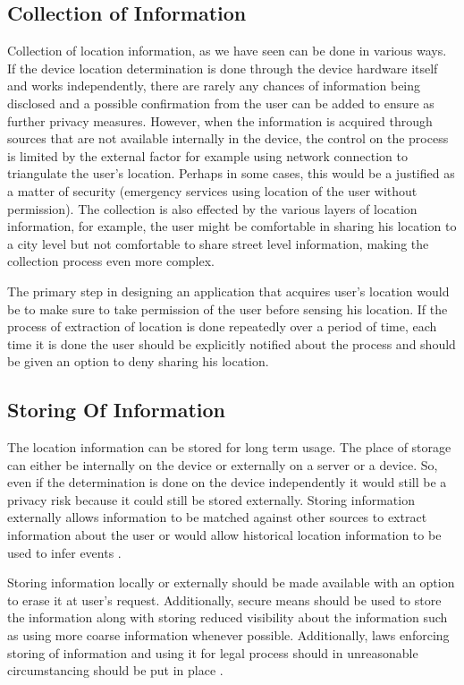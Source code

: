 \documentclass[12pt]{report}
\begin{document}
\subsection{Collection of Information}

Collection of location information, as we have seen can be done in various ways. If the device location determination is done through the device hardware itself and works independently, there are rarely any chances of information being disclosed and a possible confirmation from the user can be added to ensure as further privacy measures. However, when the information is acquired through sources that are not available internally in the device, the control on the process is limited by the external factor for example using network connection to triangulate the user's location. Perhaps in some cases, this would be a justified as a matter of security (emergency services using location of the user without permission). The collection is also effected by the various layers of location information, for example, the user might be comfortable in sharing his location to a city level but not comfortable to share street level information, making the collection process even more complex.

The primary step in designing an application that acquires user's location would be to make sure to take permission of the user before sensing his location. If the process of extraction of location is done repeatedly over a period of time, each time it is done the user should be explicitly notified about the process and should be given an option to deny sharing his location.


\subsection{Storing Of Information}
The location information can be stored for long term usage. The place of storage can either be internally on the device or externally on a server or a device. So, even if the determination is done on the device independently it would still be a privacy risk because it could still be stored externally. Storing information externally allows information to be matched against other sources to extract information about the user or would allow historical location information to be used to infer events \cite{minch2004privacy}.

Storing information locally or externally should be made available with an option to erase it at user's request. Additionally, secure means should be used to store the information along with storing reduced visibility about the information such as using more coarse information whenever possible. Additionally, laws enforcing storing of information and using it for legal process should in unreasonable circumstancing should be put in place \cite{minch2004privacy}. 
\end{document}
